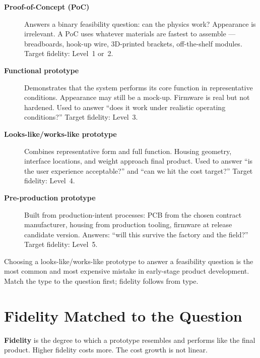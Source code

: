 \begin{description}
  \item[\textbf{Proof-of-Concept (PoC)}]
    Answers a binary feasibility question: can the physics work?
    Appearance is irrelevant.
    A PoC uses whatever materials are fastest to assemble --- breadboards,
    hook-up wire, 3D-printed brackets, off-the-shelf modules.
    Target fidelity: Level~1 or~2.

  \item[\textbf{Functional prototype}]
    Demonstrates that the system performs its core function in representative
    conditions.
    Appearance may still be a mock-up.
    Firmware is real but not hardened.
    Used to answer ``does it work under realistic operating conditions?''
    Target fidelity: Level~3.

  \item[\textbf{Looks-like/works-like prototype}]
    Combines representative form and full function.
    Housing geometry, interface locations, and weight approach final product.
    Used to answer ``is the user experience acceptable?'' and ``can we hit the
    cost target?''
    Target fidelity: Level~4.

  \item[\textbf{Pre-production prototype}]
    Built from production-intent processes: PCB from the chosen contract
    manufacturer, housing from production tooling, firmware at release
    candidate version.
    Answers: ``will this survive the factory and the field?''
    Target fidelity: Level~5.
\end{description}

Choosing a looks-like/works-like prototype to answer a feasibility question
is the most common and most expensive mistake in early-stage product
development.
Match the type to the question first; fidelity follows from type.

\section{Fidelity Matched to the Question}
\label{sec:ch2-fidelity}

\textbf{Fidelity} is the degree to which a prototype
resembles and performs like the final product.
Higher fidelity costs more.
The cost growth is not linear.

